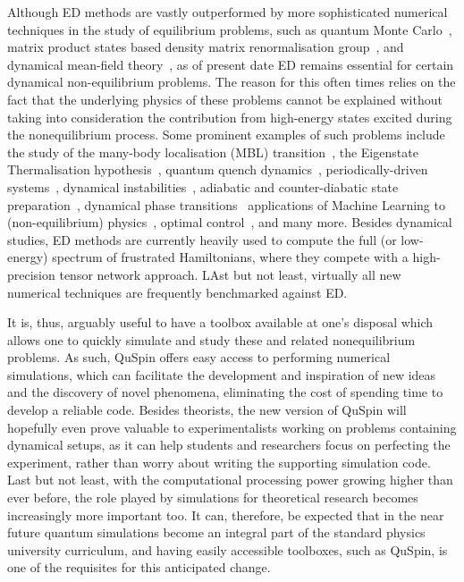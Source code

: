\documentclass{SciPost}
\newcommand\0{\scalebox{-1}[1]{0}}
\begin{document}
Although ED methods are vastly outperformed by more sophisticated numerical techniques in the study of equilibrium problems, such as quantum Monte Carlo~\cite{pollet_12,foulkes_01,acioli_97}, matrix product states based density matrix renormalisation group~\cite{daley_04,schollwock_05,schollwock_11}, and dynamical mean-field theory~\cite{georges_96,kotliar_06,aoki_14}, as of present date ED remains essential for certain dynamical non-equilibrium problems. The reason for this often times relies on the fact that the underlying physics of these problems cannot be explained without taking into consideration the contribution from high-energy states excited during the nonequilibrium process. Some prominent examples of such problems include the study of the many-body localisation (MBL) transition~\cite{altman2015universal,nandkishore_15,abanin_17,thomson_18,rubio2018probing}, the Eigenstate Thermalisation hypothesis~\cite{TD_review}, quantum quench dynamics~\cite{polkovnikov_11}, periodically-driven systems~\cite{goldman_14,bukov_review,eckardt_17,claeys2017breaking,claeys2017spin,vajna2017replica,weinberg_FAPT,howell2018frequency}, dynamical instabilities~\cite{niu_01,creffield_09,bukov_12,citro2015dynamical,bukov_17RL,lellouch_17}, adiabatic and counter-diabatic state preparation~\cite{kolodrubetz_17,delcampo_13,sels_16,bukov_GSL}, dynamical phase transitions~\cite{heyl2018dynamical,de2018stochastic} applications of Machine Learning to (non-equilibrium) physics~\cite{ML_review,bukov_17RL,dunjko_17}, optimal control~\cite{glaser_15,bukov_17symmbreak,day2018glassy}, and many more. Besides dynamical studies, ED methods are currently heavily used to compute the full (or low-energy) spectrum of frustrated Hamiltonians, where they compete with a high-precision tensor network approach. LAst but not least, virtually all new numerical techniques are frequently benchmarked against ED.

It is, thus, arguably useful to have a toolbox available at one's disposal which allows one to quickly simulate and study these and related nonequilibrium problems. As such, QuSpin offers easy access to performing numerical simulations, which can facilitate the development and inspiration of new ideas and the discovery of novel phenomena, eliminating the cost of spending time to develop a reliable code. Besides theorists, the new version of QuSpin will hopefully even prove valuable to experimentalists working on problems containing dynamical setups, as it can help students and researchers focus on perfecting the experiment, rather than worry about writing the supporting simulation code. Last but not least, with the computational processing power growing higher than ever before, the role played by simulations for theoretical research becomes increasingly more important too. It can, therefore, be expected that in the near future quantum simulations become an integral part of the standard physics university curriculum, and having easily accessible toolboxes, such as QuSpin, is one of the requisites for this anticipated change.
\end{document}
